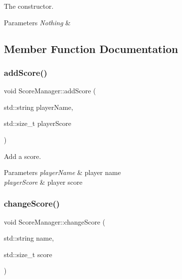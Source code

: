 The constructor. 


\begin{DoxyParams}{Parameters}
{\em Nothing} & \\
\hline
\end{DoxyParams}


\subsection{Member Function Documentation}
\mbox{\label{classScoreManager_a9fba97d65a88e67a2d219d2ba36af111}} 
\subsubsection{\texorpdfstring{add\+Score()}{addScore()}}
{\footnotesize\ttfamily void Score\+Manager\+::add\+Score (\begin{DoxyParamCaption}\item[{std\+::string}]{player\+Name,  }\item[{std\+::size\+\_\+t}]{player\+Score }\end{DoxyParamCaption})}



Add a score. 


\begin{DoxyParams}{Parameters}
{\em player\+Name} & player name \\
\hline
{\em player\+Score} & player score \\
\hline
\end{DoxyParams}
\mbox{\label{classScoreManager_a01a80dda216fa5b83b58bca8de49114e}} 
\subsubsection{\texorpdfstring{change\+Score()}{changeScore()}}
{\footnotesize\ttfamily void Score\+Manager\+::change\+Score (\begin{DoxyParamCaption}\item[{std\+::string}]{name,  }\item[{std\+::size\+\_\+t}]{score }\end{DoxyParamCaption})}



